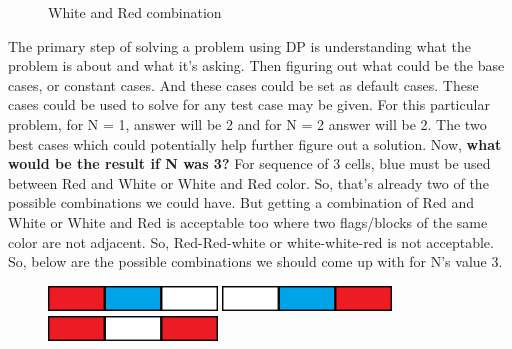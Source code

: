 \documentclass[12pt]{article}
\begin{document}
{\begin{figure}[H]
\caption{White and Red combination}
\endminipage
\end{figure}
The primary step of solving a problem using  DP is understanding what the problem is about and what it’s asking. Then figuring out what could be the base cases, or constant cases. And these cases could be set as default cases. These cases could be used to solve for any test case may be given. For this particular problem,  for N = 1, answer will be 2 and for N = 2 answer will be 2. The two best cases which could potentially help further figure out a solution.\vspace{8mm} 
\newline
Now,\textbf{ what would be the result if N was 3?}\vspace{3mm}\newline
For sequence of 3 cells, blue must be used between Red and White or White and Red color. So, that’s already two of the possible combinations we could have. But getting a combination of Red and White or White and Red is acceptable too where two flags/blocks of the same color are not adjacent. So, Red-Red-white or white-white-red is not acceptable. \vspace{3mm}
\newline
So, below are the possible combinations we should come up with for N’s value 3.
\begin{figure}[H]
\centering
\includegraphics[width=0.40\textwidth]{rbw.png}
\vspace{3mm}

\includegraphics[width=0.40\textwidth]{wbr.png}
\vspace{3mm}

\includegraphics[width=0.40\textwidth]{rwr.png}
\vspace{3mm}


\end{figure}}
\end{document}
